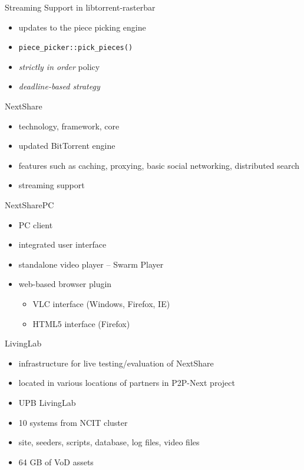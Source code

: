 \documentclass{beamer}
\begin{document}
\begin{frame}{Streaming Support in libtorrent-rasterbar}
  \begin{itemize}
    \item updates to the piece picking engine
    \item \texttt{piece\_picker::pick\_pieces()}
    \item \textit{strictly in order} policy
    \item \textit{deadline-based strategy}
  \end{itemize}
\end{frame}

\begin{frame}{NextShare}
  \begin{itemize}
    \item technology, framework, core
    \item updated BitTorrent engine
    \item features such as caching, proxying, basic social networking,
    distributed search
    \item streaming support
  \end{itemize}
\end{frame}

\begin{frame}{NextSharePC}
  \begin{itemize}
    \item PC client
    \item integrated user interface
    \item standalone video player -- Swarm Player
    \item web-based browser plugin
      \begin{itemize}
        \item VLC interface (Windows, Firefox, IE)
        \item HTML5 interface (Firefox)
      \end{itemize}
  \end{itemize}
\end{frame}

\begin{frame}{LivingLab}
  \begin{itemize}
    \item infrastructure for live testing/evaluation of NextShare
    \item located in various locations of partners in P2P-Next project
    \item UPB LivingLab
    \item 10 systems from NCIT cluster
    \item site, seeders, scripts, database, log files, video files
    \item 64 GB of VoD assets
  \end{itemize}
\end{frame}
\end{document}
